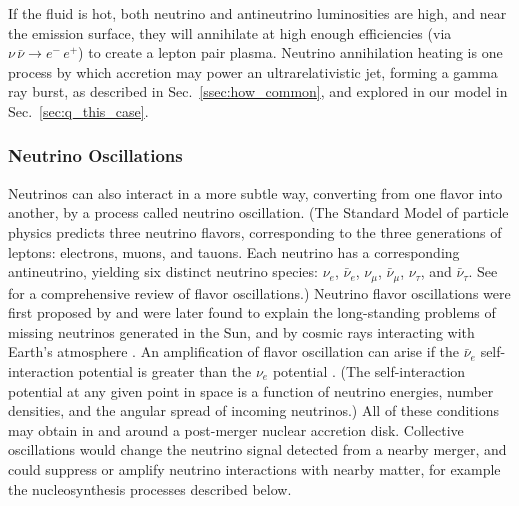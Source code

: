 If the fluid is hot, both neutrino and antineutrino luminosities are high,
and near the emission surface, they will annihilate at high enough efficiencies
(via $\nu\,\bar{\nu}\rightarrow e^{-}\,e^{+}$) to create a lepton pair plasma.
Neutrino annihilation heating is one process by which accretion may
power an ultrarelativistic jet, forming a gamma ray burst, as described in
Sec.~\ref{ssec:how_common}, and explored in our model in
Sec.~\ref{sec:q_this_case}.

\subsubsection{Neutrino Oscillations}
\label{sssc:neutrino_osc}
Neutrinos can also interact in a more subtle way, converting from one flavor into
another, by a process called neutrino oscillation.
(The Standard Model of particle physics predicts three neutrino flavors,
corresponding to the three generations of leptons: electrons, muons, and tauons.
Each neutrino has a corresponding antineutrino, yielding six distinct neutrino
species: $\nu_e$, $\bar{\nu}_e$, $\nu_\mu$, $\bar{\nu}_\mu$, $\nu_\tau$,
and $\bar{\nu}_\tau$. See \citet{kuo1989-review} for a comprehensive review
of flavor oscillations.)
Neutrino flavor oscillations were first proposed by
\citet{pont1958-nu_oscillation}
and were later found to explain the long-standing problems of missing neutrinos
generated in the Sun, and by cosmic rays interacting with Earth's atmosphere
\citep{haxt2012-review}.
An amplification of flavor oscillation can arise if the
$\bar{\nu}_e$ self-interaction potential is greater than the $\nu_e$ potential
\citep{malk2014-resonance}.
(The self-interaction potential at any given point in space is a function of
neutrino energies, number densities, and the angular spread of incoming
neutrinos.) All of these conditions may obtain in and around a post-merger
nuclear accretion disk. Collective oscillations would change the neutrino
signal detected from a nearby merger, and could suppress or amplify neutrino
interactions with nearby matter, for example the nucleosynthesis processes
described below.

